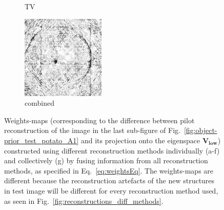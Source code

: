 \documentclass[journal]{IEEEtran}
\begin{document}
\begin{figure}[!h]
\begin{subfigure}[b]{0.24\linewidth}
        \caption{TV}
     \end{subfigure}
    \begin{subfigure}[b]{0.24\linewidth}
        \includegraphics[width=\textwidth]{../images/potato/post_tci/comparison/weightsIm_all_methods30.png}
        \caption{combined}
     \end{subfigure}
      \caption{Weights-maps (corresponding to the difference between pilot reconstruction of the image in the last sub-figure of Fig.~\ref{fig:object-prior_test_potato_A1} and its projection onto the eigenspace $\boldsymbol{V_\text{low}}$) constructed using different reconstruction methods individually (a-f) and collectively (g) by fusing information from all reconstruction methods, as specified in Eq.~\ref{eq:weightsEq}. The weights-maps are different because the reconstruction artefacts of the new structures in test image will be different for every reconstruction method used, as seen in Fig.~\ref{fig:reconstructions_diff_methods}. }
\label{fig:weights_map_2Dpotato}
\end{figure}
\end{document}
